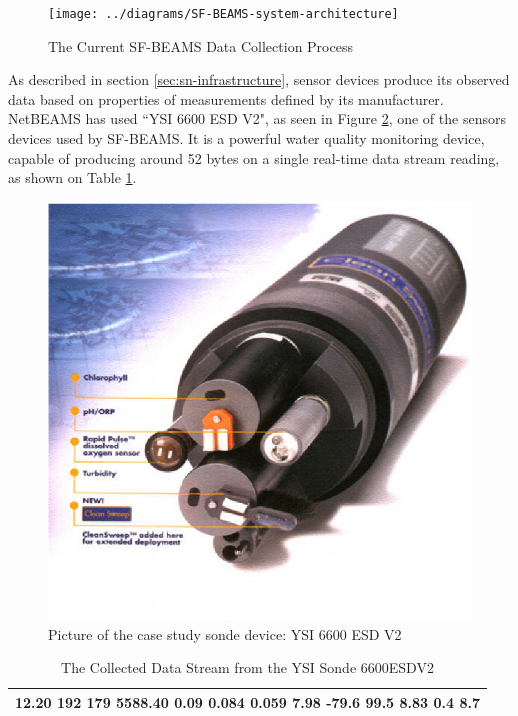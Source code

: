 \begin{figure}[!b]
  \centering
  \texttt{[image: ../diagrams/SF-BEAMS-system-architecture]}
  \caption{The Current SF-BEAMS Data Collection Process}
  \label{fig:SF-BEAMS-system-architecture}
\end{figure}

As described in section \ref{sec:sn-infrastructure}, sensor devices produce
its observed data based on properties of measurements defined by its
manufacturer. NetBEAMS has used ``YSI 6600 ESD V2", as seen in Figure
\ref{fig:ysi-device}, one of the sensors devices used by SF-BEAMS. It is a
powerful water quality monitoring device, capable of producing around 52 bytes
on a single real-time data stream reading, as shown on Table
\ref{tab:ysi-data-stream}.

\begin{figure}[!b]
  \centering
  \includegraphics[scale=0.7]{../diagrams/ysi-device}
  \caption{Picture of the case study sonde device: YSI 6600 ESD V2}
  \label{fig:ysi-device}
\end{figure}

\begin{table}
    \begin{center}
        \begin{tabular}{|l|}\hline
  12.20    192    179 5588.40   0.09   0.084   0.059  7.98   -79.6   99.5  8.83  0.4     8.7\\\hline
        \end{tabular}
    \end{center}
    \label{tab:ysi-data-stream}
    \caption{The Collected Data Stream from the YSI Sonde 6600ESDV2}
\end{table}

